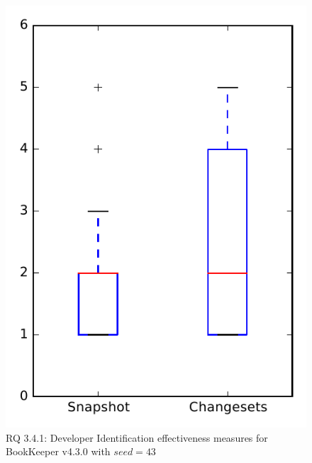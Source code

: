 
\begin{figure}
\centering
\includegraphics[height=0.4\textheight]{figures/dit_seed/rq1_bookkeeper_43}
\caption{RQ 3.4.1: Developer Identification effectiveness measures for BookKeeper v4.3.0 with $seed=43$}
\label{fig:dit_seed:rq1:bookkeeper}
\end{figure}
